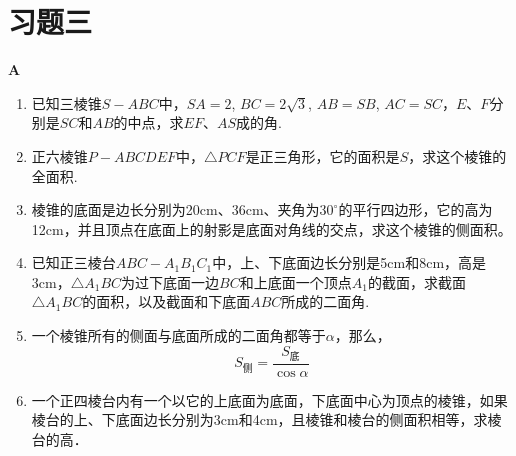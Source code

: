 \section*{习题三}
\begin{center}
    \bfseries A
\end{center}
\begin{enumerate}
\item 已知三棱锥$S-ABC$中，$SA=2$, $BC=2\sqrt{3}$, $AB=SB$, $AC=SC$，$E$、$F$分别是$SC$和$AB$的中点，求$EF$、$AS$成的角.
\item 正六棱锥$P-ABCDEF$中，$\triangle PCF$是正三角形，它的面积是$S$，求这个棱锥的全面积.
\item 棱锥的底面是边长分别为20cm、36cm、夹角为$30^{\circ}$的平行四边形，它的高为12cm，并且顶点在底面上的射影是底面对角线的交点，求这个棱锥的侧面积。
\item 已知正三棱台$ABC-A_1B_1C_1$中，上、下底面边长分别是5cm和8cm，高是3cm，$\triangle A_1BC$为过下底面一边$BC$和上底面一个顶点$A_1$的截面，求截面$\triangle A_1BC$的面积，以及截面和下底面$ABC$所成的二面角.
\item 一个棱锥所有的侧面与底面所成的二面角都等于$\alpha$，那么，
\[S_{\text{侧}}=\frac{S_{\text{底}}}{\cos\alpha}\]
\item 一个正四棱台内有一个以它的上底面为底面，下底面中心为顶点的棱锥，如果棱台的上、下底面边长分别为3cm和4cm，且棱锥和棱台的侧面积相等，求棱台的高．
\end{enumerate}

